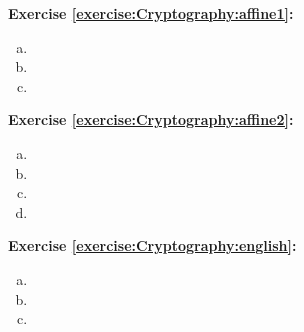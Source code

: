 
\noindent\textbf{Exercise \ref{exercise:Cryptography:affine1}:}
\begin{enumerate}[(a)]
\item
\item
\item
\end{enumerate}


\noindent\textbf{Exercise \ref{exercise:Cryptography:affine2}:}
\begin{enumerate}[(a)]
\item
\item
\item
\item
\end{enumerate}

\noindent\textbf{Exercise \ref{exercise:Cryptography:english}:}
\begin{enumerate}[(a)]
\item
\item
\item
\end{enumerate}

